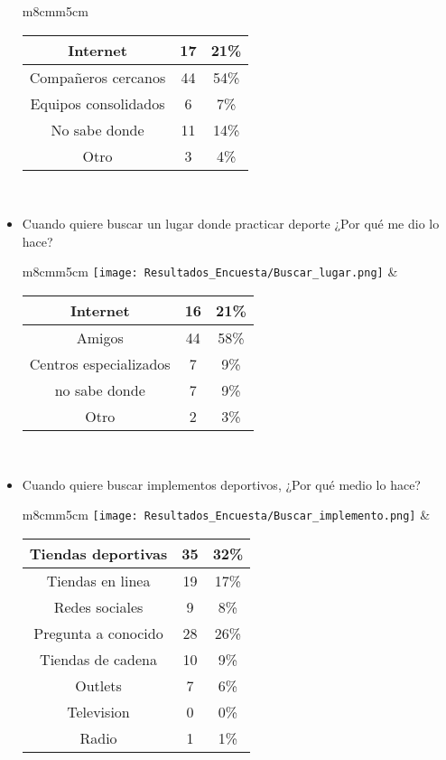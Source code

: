 \begin{itemize}
\begin{tabular}{m{8cm}m{5cm}}
\begin{tabular}{|c|cc|}
        \hline
         Internet & 17 & 21\% \\ \hline
         Compañeros cercanos & 44 & 54\% \\ \hline
         Equipos consolidados & 6 & 7\% \\ \hline
         No sabe donde & 11 & 14\% \\ \hline
         Otro & 3 & 4\% \\ \hline
        \end{tabular} \\
      \end{tabular}
  \item Cuando quiere buscar un lugar donde practicar deporte ¿Por qué me dio lo hace? \\
      \begin{tabular}{m{8cm}m{5cm}}
        \texttt{[image: Resultados\_Encuesta/Buscar\_lugar.png]} &
        \begin{tabular}{|c|cc|}
        \hline
         Internet & 16 & 21\% \\ \hline
         Amigos & 44 & 58\% \\ \hline
         Centros especializados & 7 & 9\% \\ \hline
         no sabe donde & 7 & 9\% \\ \hline
         Otro & 2 & 3\% \\ \hline
        \end{tabular} \\
      \end{tabular}
  \item Cuando quiere buscar implementos deportivos, ¿Por qué medio lo hace? \\
      \begin{tabular}{m{8cm}m{5cm}}
        \texttt{[image: Resultados\_Encuesta/Buscar\_implemento.png]} &
        \begin{tabular}{|c|cc|}
        \hline
         Tiendas deportivas & 35 & 32\% \\ \hline
         Tiendas en linea & 19 & 17\% \\ \hline
         Redes sociales & 9 & 8\% \\ \hline
         Pregunta a conocido & 28 & 26\% \\ \hline
         Tiendas de cadena & 10 & 9\% \\ \hline
         Outlets & 7 & 6\% \\ \hline
         Television & 0 & 0\% \\ \hline
         Radio & 1 & 1\% \\ \hline

\end{tabular}
\end{tabular}
\end{itemize}
